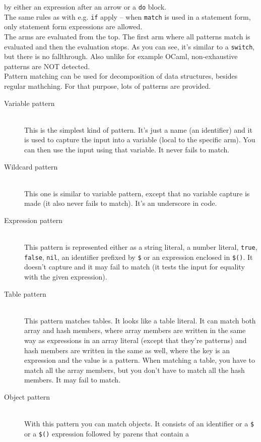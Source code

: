 \documentclass{article}
\begin{document}
by either an expression after an arrow or a \verb|do| block.\\
The same rules as with e.g. \verb|if| apply -- when \verb|match| is used in
a statement form, only statement form expressions are allowed.\\
The arms are evaluated from the top. The first arm where all patterns match
is evaluated and then the evaluation stops. As you can see, it's similar to
a \verb|switch|, but there is no fallthrough. Also unlike for example
OCaml, non-exhaustive patterns are NOT detected.\\
Pattern matching can be used for decomposition of data structures, besides
regular mathching. For that purpose, lots of patterns are provided.
\begin{description}
\item[Variable pattern] \hfill \\
This is the simplest kind of pattern. It's just a name (an identifier) and
it is used to capture the input into a variable (local to the specific arm).
You can then use the input using that variable. It never fails to match.
\item[Wildcard pattern] \hfill \\
This one is similar to variable pattern, except that no variable capture is
made (it also never fails to match). It's an underscore in code.
\item[Expression pattern] \hfill \\
This pattern is represented either as a string literal, a number literal,
\verb|true|, \verb|false|, \verb|nil|, an identifier prefixed by \verb|$|
or an expression enclosed in \verb|$()|. It doesn't capture and it may
fail to match (it tests the input for equality with the given expression).
\item[Table pattern] \hfill \\
This pattern matches tables. It looks like a table literal. It can match
both array and hash members, where array members are written in the same
way as expressions in an array literal (except that they're patterns) and
hash members are written in the same as well, where the key is an expression
and the value is a pattern. When matching a table, you have to match all
the array members, but you don't have to match all the hash members.
It may fail to match.
\item[Object pattern] \hfill \\
With this pattern you can match objects. It consists of an identifier or
a \verb|$| or a \verb|$()| expression followed by parens that contain a

\end{description}
\end{document}
